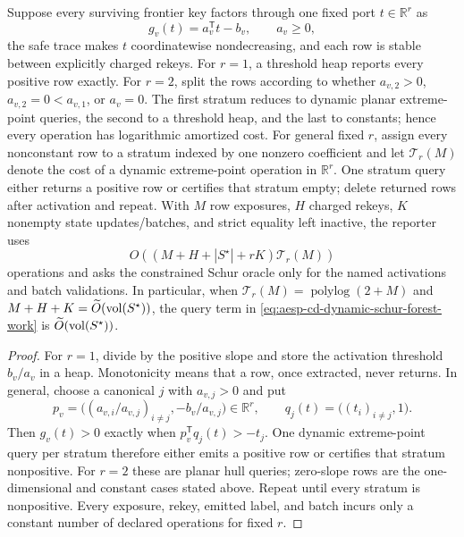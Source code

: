 \begin{corollary}
\label{cor:aesp-cd-stable-port-reporter}
Suppose every surviving frontier key factors through one fixed port
$t\in\mathbb R^r$ as
\begin{equation*}
 g_v(t)=a_v^{\mathsf T}t-b_v,\qquad a_v\geq0,
\end{equation*}
the safe trace makes $t$ coordinatewise nondecreasing, and each row is stable
between explicitly charged rekeys.  For $r=1$, a threshold heap reports every
positive row exactly.  For $r=2$, split the rows according to whether
$a_{v,2}>0$, $a_{v,2}=0<a_{v,1}$, or $a_v=0$.  The first stratum reduces to
dynamic planar extreme-point queries, the second to a threshold heap, and the
last to constants; hence every operation has logarithmic amortized cost.
For general fixed $r$, assign every nonconstant row to a stratum indexed by
one nonzero coefficient and let $\mathcal T_r(M)$ denote the cost of a
dynamic extreme-point operation in $\mathbb R^r$.  One stratum query either
returns a positive row or certifies that stratum empty; delete returned rows
after activation and repeat.  With $M$ row
exposures, $H$ charged rekeys, $K$ nonempty state updates/batches, and strict
equality left inactive, the reporter uses
\begin{equation*}
 O\!\left((M+H+|S^\star|+rK)\mathcal T_r(M)\right)
\end{equation*}
operations and asks the constrained Schur oracle only for the named
activations and batch validations.  In particular, when
$\mathcal T_r(M)=\operatorname{polylog}(2+M)$ and
$M+H+K=\widetilde O(\operatorname{vol}(S^\star))$, the query term in
\cref{eq:aesp-cd-dynamic-schur-forest-work} is
$\widetilde O(\operatorname{vol}(S^\star))$.
\end{corollary}

\begin{proof}
For $r=1$, divide by the positive slope and store the activation threshold
$b_v/a_v$ in a heap.  Monotonicity means that a row, once extracted, never
returns.  In general, choose a canonical $j$ with $a_{v,j}>0$ and put
\begin{equation*}
 p_v=\bigl((a_{v,i}/a_{v,j})_{i\neq j},-b_v/a_{v,j}\bigr)
 \in\mathbb R^r,\qquad
 q_j(t)=\bigl((t_i)_{i\neq j},1\bigr).
\end{equation*}
Then $g_v(t)>0$ exactly when
$p_v^{\mathsf T}q_j(t)>-t_j$.  One dynamic extreme-point query per stratum
therefore either emits a positive row or certifies that stratum nonpositive.
For $r=2$
these are planar hull queries; zero-slope rows are the one-dimensional and
constant cases stated above.  Repeat until every stratum is nonpositive.
Every exposure, rekey, emitted label, and batch incurs only a constant number
of declared operations for fixed $r$.
\end{proof}

